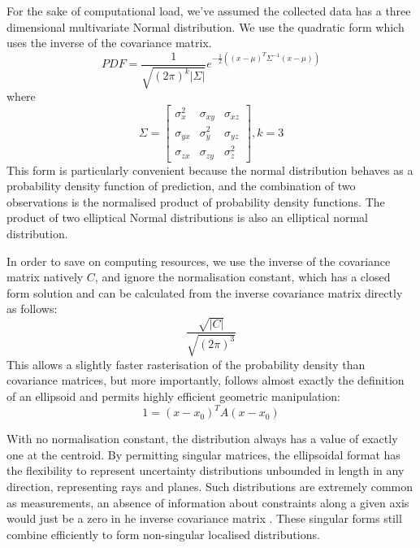 \documentclass{article}
\newcounter{subsubsubsection}[subsubsection]
\begin{document}
        For the sake of computational load, we've assumed the collected data has a three dimensional multivariate Normal distribution.  We use the quadratic form which uses the inverse of the covariance matrix.
        \begin{equation}
        PDF = \frac{1}{\sqrt {(2\pi)^k|\Sigma|}} e^{-\frac{1}{2}\left( \left(x-\mu\right)^T \Sigma^{-1} \left(x-\mu\right) \right)}
        \end{equation}
        where
        \begin{equation}
        \Sigma=\begin{bmatrix}
          \sigma_x^2 & \sigma_{xy} & \sigma_{xz} \\[0.3em]
          \sigma_{yx} & \sigma_y^2 & \sigma_{yz} \\[0.3em]
          \sigma_{zx} & \sigma_{zy} & \sigma_z^2 
        \end{bmatrix}, k=3
        \end{equation}
        This form is particularly convenient because the normal distribution behaves as a probability density function of prediction, and the combination of two observations is the normalised product of probability density functions.  The product of two elliptical Normal distributions is also an elliptical normal distribution.  

        In order to save on computing resources, we use the inverse of the covariance matrix natively \(C\), and ignore the normalisation constant, which has a closed form solution and can be calculated from the inverse covariance matrix directly as follows:
        \begin{equation}
        \frac{\sqrt{|C|}}{\sqrt{(2\pi)^3}}
        \end{equation}
        This allows a slightly faster rasterisation of the probability density than covariance matrices, but more importantly, follows almost exactly the definition of an ellipsoid and permits highly efficient geometric manipulation:
        \begin{equation}
        1 = \left(x-x_0\right)^T A \left(x-x_0\right)
        \end{equation}

        With no normalisation constant, the distribution always has a value of exactly one at the centroid.
        By permitting singular matrices, the ellipsoidal format has the flexibility to represent uncertainty distributions unbounded in length in any direction, representing rays and planes.  Such distributions are extremely common as measurements, an absence of information about constraints along a given axis would just be a zero in he inverse covariance matrix \cite{UncertainGeo}.  These singular forms still combine efficiently to form non-singular localised distributions.
        
\end{document}
